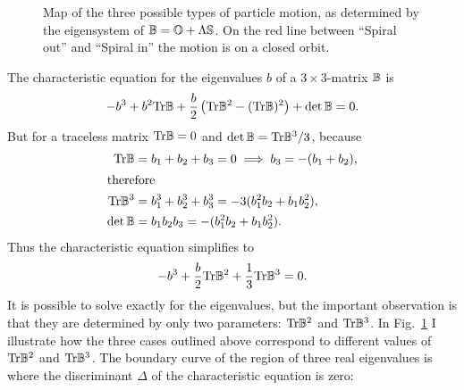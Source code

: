 \documentclass[thesis.tex]{subfiles}
\begin{document}
\begin{figure}
\centering
{}
\caption{\label{fig:bmap}  Map of the three possible types of particle motion, as determined by the eigensystem of $\mathbb{B}=\mathbb{O} + \Lambda \mathbb{S}$. On the red line between ``Spiral out'' and ``Spiral in'' the motion is on a closed orbit.}%
\end{figure}
The characteristic equation for the eigenvalues $b$ of a $3\times3$-matrix $\mathbb{B}$ is
\begin{align}
	-b^3 + b^2\mbox{Tr} \mathbb{B}  + \frac{b}{2}\left(\mbox{Tr} \mathbb{B}^2-(\mbox{Tr} \mathbb{B})^2\right)+\det\mathbb{B} = 0.
\end{align}
But for a traceless matrix $\mbox{Tr} \mathbb{B}=0$ and $\det \mathbb{B} = \mbox{Tr}\mathbb{B}^3/3$, because
\begin{align}
	\mbox{Tr} \mathbb{B} &= b_1 + b_2 + b_3 = 0 \implies b_3 = -(b_1 + b_2),\\
	\intertext{therefore}
	\mbox{Tr} \mathbb{B}^3 &= b_1^3 + b_2^3 + b_3^3 = -3(b_1^2b_2 + b_1b_2^2),\\
	\det \mathbb{B} &= b_1b_2b_3 = -(b_1^2b_2 + b_1b_2^2).
\end{align}
Thus the characteristic equation simplifies to
\begin{align}
	-b^3 + \frac{b}{2}\tr \ma B^2 +\frac{1}{3}\tr\ma B^3 = 0. \eqnlab{bcharacteristic}
\end{align}
It is possible to solve  exactly for the eigenvalues, but the important observation is that they are determined by only two parameters: $\mbox{Tr} \mathbb{B}^2$ and $\mbox{Tr}\mathbb{B}^3$. In Fig.~\ref{fig:bmap} I illustrate how the three cases outlined above correspond to different values of $\mbox{Tr} \mathbb{B}^2$ and $\mbox{Tr}\mathbb{B}^3$. The boundary curve of the region of three real eigenvalues is where the discriminant $\Delta$ of the characteristic equation is zero:
\end{document}
